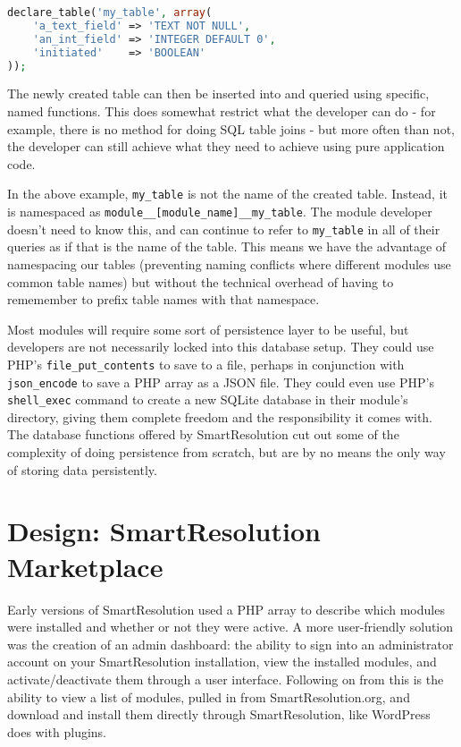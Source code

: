 \begin{lstlisting}[language=php]
declare_table('my_table', array(
    'a_text_field' => 'TEXT NOT NULL',
    'an_int_field' => 'INTEGER DEFAULT 0',
    'initiated'    => 'BOOLEAN'
));
\end{lstlisting}

The newly created table can then be inserted into and queried using specific, named functions. This does somewhat restrict what the developer can do - for example, there is no method for doing SQL table joins - but more often than not, the developer can still achieve what they need to achieve using pure application code.

In the above example, \lstinline{my_table} is not the name of the created table. Instead, it is namespaced as \lstinline{module__[module_name]__my_table}. The module developer doesn't need to know this, and can continue to refer to \lstinline{my_table} in all of their queries as if that is the name of the table. This means we have the advantage of namespacing our tables (preventing naming conflicts where different modules use common table names) but without the technical overhead of having to rememember to prefix table names with that namespace.

Most modules will require some sort of persistence layer to be useful, but developers are not necessarily locked into this database setup. They could use PHP's \lstinline{file_put_contents} to save to a file, perhaps in conjunction with \lstinline{json_encode} to save a PHP array as a JSON file. They could even use PHP's \lstinline{shell_exec} command to create a new SQLite database in their module's directory, giving them complete freedom and the responsibility it comes with. The database functions offered by SmartResolution cut out some of the complexity of doing persistence from scratch, but are by no means the only way of storing data persistently.

\section{Design: SmartResolution Marketplace}

Early versions of SmartResolution used a PHP array to describe which modules were installed and whether or not they were active. A more user-friendly solution was the creation of an admin dashboard: the ability to sign into an administrator account on your SmartResolution installation, view the installed modules, and activate/deactivate them through a user interface. Following on from this is the ability to view a list of modules, pulled in from SmartResolution.org, and download and install them directly through SmartResolution, like WordPress does with plugins.

